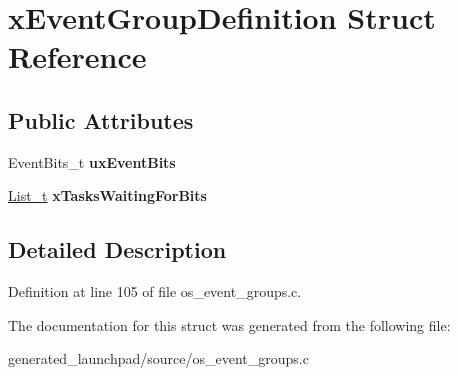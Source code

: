 \hypertarget{structxEventGroupDefinition}{}\section{x\+Event\+Group\+Definition Struct Reference}
\label{structxEventGroupDefinition}
\subsection*{Public Attributes}
\begin{DoxyCompactItemize}
\item 
\mbox{\label{structxEventGroupDefinition_ad7c19a46f5f4557e466209962b5e4610}} 
Event\+Bits\+\_\+t {\bfseries ux\+Event\+Bits}
\item 
\mbox{\label{structxEventGroupDefinition_a6570ba98d93dcba9cb03de0c62df9044}} 
\mbox{\hyperlink{structxLIST}{List\+\_\+t}} {\bfseries x\+Tasks\+Waiting\+For\+Bits}
\end{DoxyCompactItemize}


\subsection{Detailed Description}


Definition at line 105 of file os\+\_\+event\+\_\+groups.\+c.



The documentation for this struct was generated from the following file\+:\begin{DoxyCompactItemize}
\item 
generated\+\_\+launchpad/source/os\+\_\+event\+\_\+groups.\+c\end{DoxyCompactItemize}
